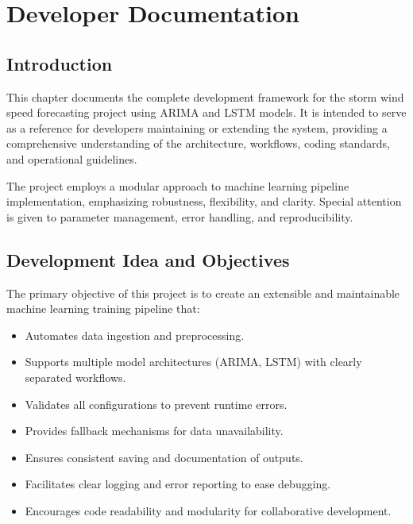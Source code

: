 %
%
%

\chapter{Developer Documentation}

\section{Introduction}

This chapter documents the complete development framework for the storm wind speed forecasting project using ARIMA and LSTM models.  
It is intended to serve as a reference for developers maintaining or extending the system, providing a comprehensive understanding of the architecture, workflows, coding standards, and operational guidelines.  

The project employs a modular approach to machine learning pipeline implementation, emphasizing robustness, flexibility, and clarity.  
Special attention is given to parameter management, error handling, and reproducibility.

\section{Development Idea and Objectives}

The primary objective of this project is to create an extensible and maintainable machine learning training pipeline that:

\begin{itemize}
	\item Automates data ingestion and preprocessing.
	\item Supports multiple model architectures (ARIMA, LSTM) with clearly separated workflows.
	\item Validates all configurations to prevent runtime errors.
	\item Provides fallback mechanisms for data unavailability.
	\item Ensures consistent saving and documentation of outputs.
	\item Facilitates clear logging and error reporting to ease debugging.
	\item Encourages code readability and modularity for collaborative development.
\end{itemize}

